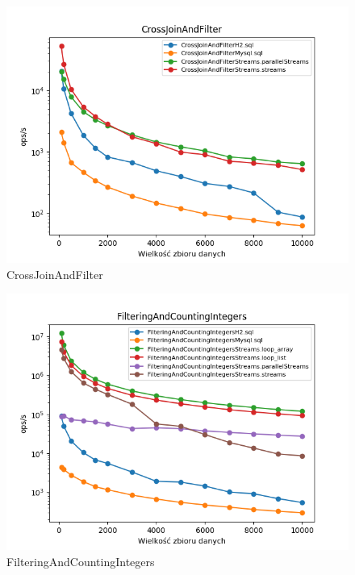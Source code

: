 \documentclass[12pt]{extarticle}
\begin{document}
\begin{figure}[H]
\centering
\includegraphics[width=15cm]{plots/CrossJoinAndFilter}
\caption{CrossJoinAndFilter}
\end{figure}

\begin{figure}[H]
\centering
\includegraphics[width=15cm]{plots/FilteringAndCountingIntegers}
\caption{FilteringAndCountingIntegers}
\end{figure}
\end{document}
